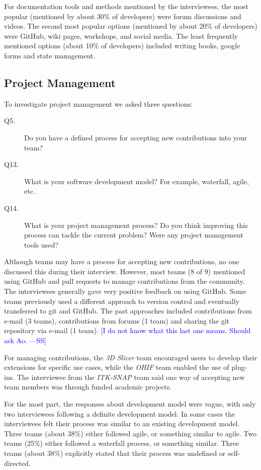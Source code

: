 \documentclass[final, 3p, times, authoryear]{elsarticle}
\newcommand{\authornote}[3]{\textcolor{#1}{[#3 ---#2]}}
\newcommand{\authornote}[3]{}
\newcommand{\wss}[1]{\authornote{blue}{SS}{#1}} %
\begin{document}
For documentation tools and methods mentioned by the interviewees, the most
popular (mentioned by about 30\% of developers) were forum discussions and
videos.  The second most popular options (mentioned by about 20\% of developers)
were GitHub, wiki pages, workshops, and social media.  The least frequently
mentioned options (about 10\% of developers) included writing books, google
forms and state management.

\subsection{Project Management} \label{sec_contribution_pm}

To investigate project management we asked three questions:

\begin{description}
\item[Q5.] Do you have a defined process for accepting new contributions into
your team?
\item[Q13.] What is your software development model? For example, waterfall,
agile, etc.
\item[Q14.] What is your project management process? Do you
think improving this process can tackle the current problem? Were any project
management tools used?
\end{description}

Although teams may have a process for accepting new contributions, no one
discussed this during their interview. However, most teams (8 of 9) mentioned
using GitHub and pull requests to manage contributions from the community. The
interviewees generally gave very positive feedback on using GitHub. Some teams
previously used a different approach to version control and eventually
transferred to git and GitHub.  The past approaches included contributions
from e-mail (3 teams), contributions from forums (1 team) and sharing the
git repository via e-mail (1 team).  \wss{I do not know what this last one means.
Should ask Ao.}

For managing contributions, the \textit{3D Slicer} team encouraged users to
develop their extensions for specific use cases, while the \textit{OHIF} team
enabled the use of plug-ins.  The interviewee from the \textit{ITK-SNAP} team
said one way of accepting new team members was through funded academic projects.

For the most part, the responses about development model were vague, with only
two interviewees following a definite development model. In some cases the
interviewees felt their process was similar to an existing development model.
Three teams (about 38\%) either followed agile, or something similar to agile.
Two teams (25\%) either followed a waterfall process, or something similar.
Three teams (about 38\%) explicitly stated that their process was undefined or
self-directed.
\end{document}
